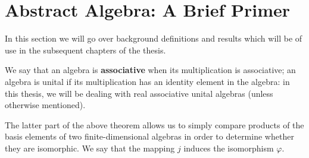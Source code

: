 \section{Abstract Algebra: A Brief Primer}\label{s:algebra}
In this section we will go over background definitions and results which will be of use in the subsequent chapters of the thesis.

%
%
%
%
%
%
%
%
%
%



We say that an algebra is \textbf{associative} when its multiplication is associative; an algebra is unital if its multiplication has an identity element in the algebra: in this thesis, we will be dealing with real associative unital algebras (unless otherwise mentioned).








	
The latter part of the above theorem allows us to simply compare products of the basis elements of two finite-dimensional algebras in order to determine whether they are isomorphic. We say that the mapping $j$ induces the isomorphism $\varphi$.

%





